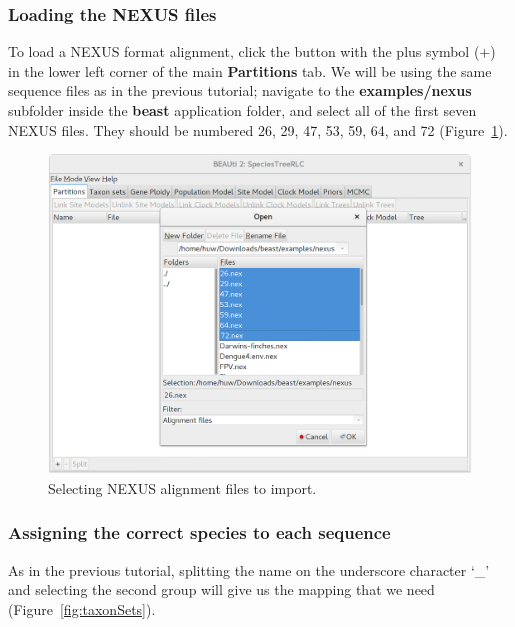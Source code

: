 \documentclass{article}
\begin{document}
\clearpage

\subsubsection*{Loading the NEXUS files}

To load a NEXUS format alignment, click the button with the plus symbol ($+$) in
the lower left corner of the main \textbf{Partitions} tab. We will be using the
same sequence files as in the previous tutorial;
navigate to the \textbf{examples/nexus} subfolder inside the \textbf{beast}
application folder, and select all of the first seven NEXUS files. They should
be numbered 26, 29, 47, 53, 59, 64, and 72 (Figure~\ref{fig:importAlignments}).

\begin{figure}[htb!]
\centering
\includegraphics[width=\textwidth]{figures/beauti-import.png}
\caption{Selecting NEXUS alignment files to import.}
\label{fig:importAlignments}
\end{figure}

\clearpage

\subsubsection*{Assigning the correct species to each sequence}

As in the previous tutorial, splitting the name on the underscore character
`\_' and selecting the second group will give us the mapping that we need
(Figure~\ref{fig:taxonSets}).
\end{document}
